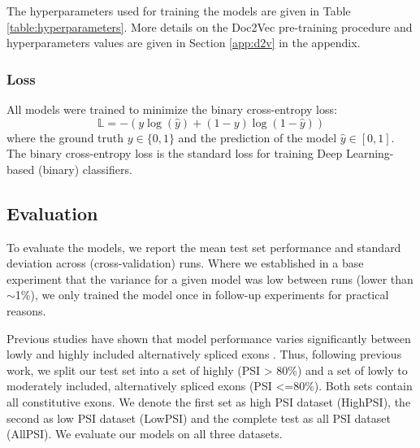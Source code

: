 The hyperparameters used for training the models are given in Table \ref{table:hyperparameters}. More details on the Doc2Vec pre-training procedure and hyperparameters values are given in Section \ref{app:d2v} in the appendix.

\subsubsection{Loss}  \label{subsubsec:loss}
All models were trained to minimize the binary cross-entropy loss:
$$\mathbb{L} = - (y \log(\hat{y}) + (1 - y) \log (1 - \hat{y}))$$
where the ground truth $y \in \{0, 1\}$ and the prediction of the model $\hat{y} \in [0, 1]$. The binary cross-entropy loss is the standard loss for training Deep Learning-based (binary) classifiers.

\subsection{Evaluation}

To evaluate the models, we report the mean test set performance and standard deviation across (cross-validation) runs. 
Where we established in a base experiment that the variance for a given model was low between runs (lower than $\sim$1\%), we only trained the model once in follow-up experiments for practical reasons.

Previous studies have shown that model performance varies significantly between lowly and highly included alternatively spliced exons \cite{dsc} \cite{buschhertel}. Thus, following previous work, we split our test set into a set of highly (PSI > 80\%) and a set of lowly to moderately included, alternatively spliced exons (PSI <=80\%). Both sets contain all constitutive exons. We denote the first set as high PSI dataset (HighPSI), the second as low PSI dataset (LowPSI) and the complete test as all PSI dataset (AllPSI). We evaluate our models on all three datasets.


